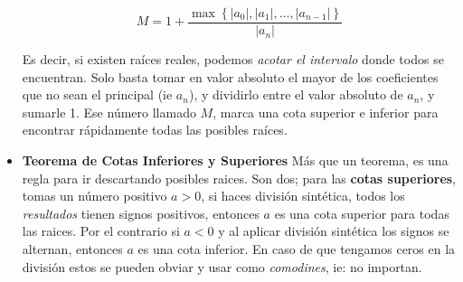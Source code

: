 \documentclass[pdftex,11pt,a4paper]{article}
\begin{document}
\begin{itemize}
	$$M = 1 + \dfrac{\max{\left\{|a_0|, |a_1|, \ldots, |a_{n-1}| \right\}}}{|a_n|}$$
	
	Es decir, si existen raíces reales, podemos \textit{acotar el intervalo} donde todos se encuentran. Solo basta tomar en valor absoluto el mayor de los coeficientes que no sean el principal (ie $a_n$), y dividirlo entre el valor absoluto de $a_n$, y sumarle 1. Ese número llamado $M$, marca una cota superior e inferior para encontrar rápidamente todas las posibles raíces. 		
	
	\item \textbf{Teorema de Cotas Inferiores y Superiores} Más que un teorema, es una regla para ir descartando posibles raices. Son dos; para las \textbf{cotas superiores}, tomas un número positivo $a>0$, si haces división sintética, todos los \textit{resultados} tienen signos positivos, entonces $a$ es una cota superior para todas las raices. Por el contrario si $a<0$ y al aplicar división sintética los signos se alternan, entonces $a$ es una cota inferior. En caso de que tengamos ceros en la división estos se pueden obviar y usar como \textit{comodines}, ie: no importan. 
	
\end{itemize}
\end{document}
